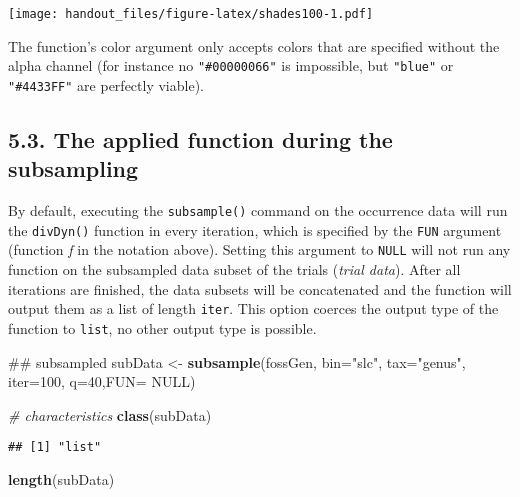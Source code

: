 \documentclass[]{article}
\newenvironment{Shaded}{\begin{snugshade}}{\end{snugshade}}
\newcommand{\CommentTok}[1]{\textcolor[rgb]{0.56,0.35,0.01}{\textit{#1}}}
\newcommand{\DataTypeTok}[1]{\textcolor[rgb]{0.13,0.29,0.53}{#1}}
\newcommand{\DecValTok}[1]{\textcolor[rgb]{0.00,0.00,0.81}{#1}}
\newcommand{\KeywordTok}[1]{\textcolor[rgb]{0.13,0.29,0.53}{\textbf{#1}}}
\newcommand{\NormalTok}[1]{#1}
\newcommand{\OtherTok}[1]{\textcolor[rgb]{0.56,0.35,0.01}{#1}}
\newcommand{\StringTok}[1]{\textcolor[rgb]{0.31,0.60,0.02}{#1}}
\begin{document}
\texttt{[image: handout\_files/figure-latex/shades100-1.pdf]}

The function's color argument only accepts colors that are specified
without the alpha channel (for instance no \texttt{"\#00000066"} is
impossible, but \texttt{"blue"} or \texttt{"\#4433FF"} are perfectly
viable).

\hypertarget{the-applied-function-during-the-subsampling}{%
\subsection{5.3. The applied function during the
subsampling}\label{the-applied-function-during-the-subsampling}}

By default, executing the \texttt{subsample()} command on the occurrence
data will run the \texttt{divDyn()} function in every iteration, which
is specified by the \texttt{FUN} argument (function \emph{f} in the
notation above). Setting this argument to \texttt{NULL} will not run any
function on the subsampled data subset of the trials (\emph{trial
data}). After all iterations are finished, the data subsets will be
concatenated and the function will output them as a list of length
\texttt{iter}. This option coerces the output type of the function to
\texttt{list}, no other output type is possible.

\begin{Shaded}
\begin{Highlighting}[]
\NormalTok{## subsampled }
\NormalTok{subData <-}\StringTok{ }\KeywordTok{subsample}\NormalTok{(fossGen, }\DataTypeTok{bin=}\StringTok{"slc"}\NormalTok{, }\DataTypeTok{tax=}\StringTok{"genus"}\NormalTok{, }
  \DataTypeTok{iter=}\DecValTok{100}\NormalTok{, }\DataTypeTok{q=}\DecValTok{40}\NormalTok{,}\DataTypeTok{FUN=} \OtherTok{NULL}\NormalTok{)}
\end{Highlighting}
\end{Shaded}

\begin{Shaded}
\begin{Highlighting}[]
\CommentTok{# characteristics}
\KeywordTok{class}\NormalTok{(subData)}
\end{Highlighting}
\end{Shaded}

\begin{verbatim}
## [1] "list"
\end{verbatim}

\begin{Shaded}
\begin{Highlighting}[]
\KeywordTok{length}\NormalTok{(subData)}
\end{Highlighting}
\end{Shaded}
\end{document}

